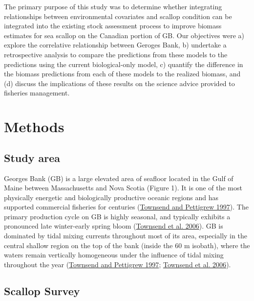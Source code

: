 \documentclass[
]{article}
\begin{document}
The primary purpose of this study was to determine whether integrating relationships between environmental covariates and scallop condition can be integrated into the existing stock assessment process to improve biomass estimates for sea scallop on the Canadian portion of GB. Our objectives were a) explore the correlative relationship between Geroges Bank, b) undertake a retrospective analysis to compare the predictions from these models to the predictions using the current biological-only model, c) quantify the difference in the biomass predictions from each of these models to the realized biomass, and (d) discuss the implications of these results on the science advice provided to fisheries management.

\hypertarget{ref-methods}{%
\section{Methods}\label{ref-methods}}

\hypertarget{study-area}{%
\subsection{Study area}\label{study-area}}

Georges Bank (GB) is a large elevated area of seafloor located in the Gulf of Maine between Massachusetts and Nova Scotia (Figure 1). It is one of the most physically energetic and biologically productive oceanic regions and has supported commercial fisheries for centuries (\protect\hyperlink{ref-townsendNitrogenLimitationSecondary1997}{Townsend and Pettigrew 1997}). The primary production cycle on GB is highly seasonal, and typically exhibits a pronounced late winter-early spring bloom (\protect\hyperlink{ref-townsendOceanographyNorthwestAtlantic2006}{Townsend et al. 2006}). GB is dominated by tidal mixing currents throughout most of its area, especially in the central shallow region on the top of the bank (inside the 60 m isobath), where the waters remain vertically homogeneous under the influence of tidal mixing throughout the year (\protect\hyperlink{ref-townsendNitrogenLimitationSecondary1997}{Townsend and Pettigrew 1997}; \protect\hyperlink{ref-townsendOceanographyNorthwestAtlantic2006}{Townsend et al. 2006}).

\hypertarget{scallop-survey}{%
\subsection{Scallop Survey}\label{scallop-survey}}
\end{document}
